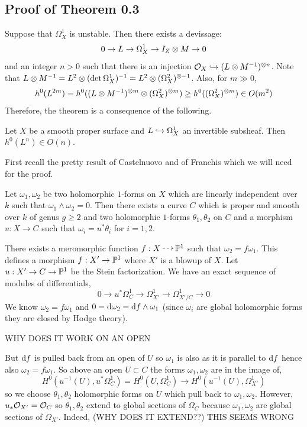 \documentclass[main.tex]{subfiles}
\begin{document}
\subsection{Proof of Theorem 0.3}

Suppose that $\Omega_X^1$ is unstable. Then there exists a devissage:
\[ 0 \to L \to \Omega^1_X \to I_Z \ot M \to 0 \]
and an integer $n > 0$ such that there is an injection $\cO_X \embed (L \ot M^{-1})^{\ot n}$. Note that $L \ot M^{-1}  = L^2 \ot (\det{\Omega^1_X})^{-1} = L^2 \ot (\Omega_X^2)^{\ot -1}$. Also, for $m \gg 0$,
\[ h^0(L^{2m}) = h^0((L \ot M^{-1})^{\ot m} \ot (\Omega^2_X)^{\ot m}) \ge h^0((\Omega_X^2)^{\ot m}) \in O(m^2) \]
Therefore, the theorem is a consequence of the following.

\begin{theorem}[Bogomolov]
Let $X$ be a smooth proper surface and $L \embed \Omega_X^1$ an invertible subsheaf. Then $h^0(L^n) \in O(n)$.
\end{theorem}

First recall the pretty result of Castelnuovo and of Franchis which we will need for the proof.

\begin{lemma}[4, 12]
Let $\omega_1, \omega_2$ be two holomorphic $1$-forms on $X$ which are linearly independent over $k$ such that $\omega_1 \wedge \omega_2 = 0$. Then there exists a curve $C$ which is proper and smooth over $k$ of genus $g \ge 2$ and two holomorphic $1$-forms $\theta_1, \theta_2$ on $C$ and a morphism $u : X \to C$ such that $\omega_i = u^* \theta_i$ for $i = 1,2$.
\end{lemma}

There exists a meromorphic function $f : X \rat \P^1$ such that $\omega_2 = f \omega_1$. This defines a morphism $f : X' \to \P^1$ where $X'$ is a blowup of $X$. Let $u : X' \to C \to \P^1$ be the Stein factorization.  We have an exact sequence of modules of differentials,
\[ 0 \to u^* \Omega^1_C \to \Omega^1_{X'} \to \Omega^1_{X'/C} \to 0 \]
We know $\omega_2 = f \omega_1$ and $0 = \d{\omega_2} = \d{f} \wedge \omega_1$ (since $\omega_i$ are global holomorphic forms they are closed by Hodge theory).

{\color{red} WHY DOES IT WORK ON AN OPEN}

But $\d{f}$ is pulled back from an open of $U$ so $\omega_1$ is also as it is parallel to $\d{f}$ hence also $\omega_2 = f \omega_1$. So above an open $U \subset C$ the forms $\omega_1, \omega_2$ are in the image of,
\[ H^0(u^{-1}(U), u^* \Omega_C^1) = H^0(U, \Omega^1_C) \to H^0(u^{-1}(U), \Omega^1_{X'}) \]
so we choose $\theta_1, \theta_2$ holomorphic forms on $U$ which pull back to $\omega_1, \omega_2$. However, $u_* \cO_{X'} = \cO_{C}$ so $\theta_1, \theta_2$ extend to global sections of $\Omega_C$ because $\omega_1, \omega_2$ are global sections of $\Omega_{X'}$. Indeed,
{\color{red} (WHY DOES IT EXTEND??) THIS SEEMS WRONG}
\end{document}
